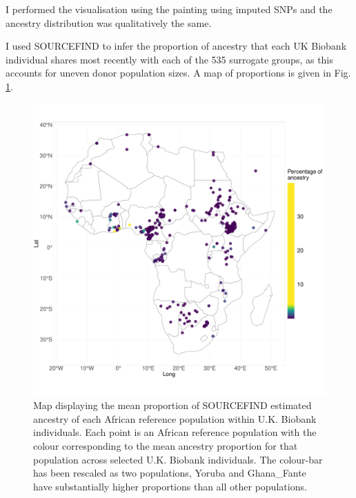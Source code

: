 I performed the visualisation using the painting using imputed SNPs and the ancestry distribution was qualitatively the same. 

I used SOURCEFIND to infer the proportion of ancestry that each UK Biobank individual shares most recently with each of the 535 surrogate groups, as this accounts for uneven donor population sizes. A map of proportions is given in Fig. \ref{fig:SF_props_map}.

\begin{figure}[htp]
    \centering
    \includegraphics[width=1.0\textwidth]{../images/chapter3/SF_props_map.pdf}
    \caption{Map displaying the mean proportion of SOURCEFIND estimated ancestry of each African reference population within U.K. Biobank individuals. Each point is an African reference population with the colour corresponding to the mean ancestry proportion for that population across selected U.K. Biobank individuals. The colour-bar has been rescaled as two populations, Yoruba and Ghana\_Fante have substantially higher proportions than all other populations.} 
    \label{fig:SF_props_map}
\end{figure}


